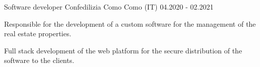 
\cventry
{Software developer}
{Confedilizia Como}
{Como (IT)}
{04.2020 - 02.2021}
{
    \begin{cvitems}
        \item {Responsible for the development of a custom software for the management of the real estate properties.}
        \item {Full stack development of the web platform for the secure distribution of the software to the clients.}
    \end{cvitems}
}